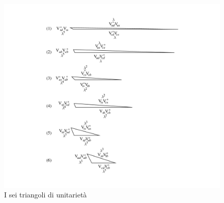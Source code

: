 \begin{figure}
\begin{center}
\includegraphics[scale=0.18]{Immagini/triangoli}
\caption{I sei triangoli di unitarietà}
\end{center}
\end{figure}
